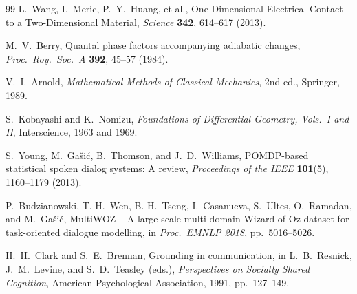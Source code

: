 \documentclass[11pt,letterpaper]{article}
\begin{document}
\begin{thebibliography}{99}
L.~Wang, I.~Meric, P.~Y.~Huang, et al.,
One-Dimensional Electrical Contact to a Two-Dimensional Material,
\emph{Science} \textbf{342}, 614--617 (2013).

M.~V.\ Berry,
Quantal phase factors accompanying adiabatic changes,
\emph{Proc.\ Roy.\ Soc.\ A} \textbf{392}, 45--57 (1984).

V.~I.\ Arnold,
\emph{Mathematical Methods of Classical Mechanics}, 2nd ed.,
Springer, 1989.

S.~Kobayashi and K.~Nomizu,
\emph{Foundations of Differential Geometry, Vols.~I and II},
Interscience, 1963 and 1969.

S.~Young, M.~Ga\v{s}i\'c, B.~Thomson, and J.~D.\ Williams,
POMDP-based statistical spoken dialog systems: A review,
\emph{Proceedings of the IEEE} \textbf{101}(5), 1160--1179 (2013).

P.~Budzianowski, T.-H.\ Wen, B.-H.\ Tseng, I.~Casanueva,
S.~Ultes, O.~Ramadan, and M.~Ga\v{s}i\'c,
MultiWOZ -- A large-scale multi-domain Wizard-of-Oz dataset for
task-oriented dialogue modelling,
in \emph{Proc.\ EMNLP 2018}, pp.\ 5016--5026.

H.~H.\ Clark and S.~E.\ Brennan,
Grounding in communication, in
L.~B.\ Resnick, J.~M.\ Levine, and S.~D.\ Teasley (eds.),
\emph{Perspectives on Socially Shared Cognition},
American Psychological Association, 1991, pp.\ 127--149.

\end{thebibliography}
\end{document}
